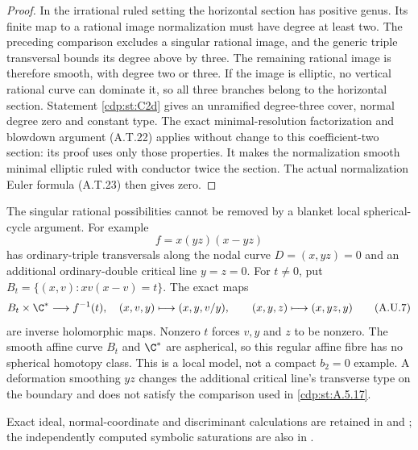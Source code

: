 \begin{proof}
In the irrational ruled setting the horizontal
section has positive genus. Its finite map to a
rational image normalization must have degree at
least two. The preceding comparison excludes a
singular rational image, and the generic triple
transversal bounds its degree above by three.
The remaining rational image is therefore smooth,
with degree two or three. If the image is elliptic,
no vertical rational curve can dominate it, so all
three branches belong to the horizontal section.
Statement \ref{cdp:st:C2d} gives an unramified degree-three
cover, normal degree zero and constant type.
The exact minimal-resolution factorization and
blowdown argument (A.T.22) applies without change
to this coefficient-two section: its proof uses
only those properties. It makes the normalization
smooth minimal elliptic ruled with conductor twice
the section. The actual normalization Euler formula
(A.T.23) then gives zero.
\end{proof}

The singular rational possibilities cannot be
removed by a blanket local spherical-cycle argument.
For example
\[
                     f=x(yz)(x-yz)
                                                        \tag{A.U.6}\label{cdp:eq:A.U.6}
\]
has ordinary-triple transversals along the nodal curve
$D=(x,yz)=0$ and an additional ordinary-double
critical line $y=z=0$. For $t\ne0$, put
$B_t=\{(x,v):xv(x-v)=t\}$. The exact maps
\[
 B_t\times\C^*\longrightarrow f^{-1}(t),
 \quad (x,v,y)\longmapsto(x,y,v/y),\qquad
 (x,y,z)\longmapsto(x,yz,y)
                                                        \tag{A.U.7}\label{cdp:eq:A.U.7}
\]
are inverse holomorphic maps. Nonzero $t$ forces
$v,y$ and $z$ to be nonzero. The smooth affine
curve $B_t$ and $\C^*$ are aspherical, so this
regular affine fibre has no spherical homotopy
class. This is a local model, not a compact
$b_2=0$ example. A deformation smoothing $yz$
changes the additional critical line's transverse
type on the boundary and does not satisfy the
comparison used in \ref{cdp:st:A.5.17}.

Exact ideal, normal-coordinate and discriminant
calculations are retained in
 and
; the independently
computed symbolic saturations are also in
.


